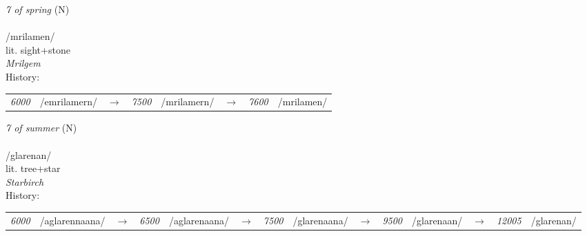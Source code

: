 \vspace{15pt}
\begin{nopagebreak}
 \textit{7 of spring} (N)\\
\\
\noindent /mril{\textprimstress}amen/\\
\noindent lit. sight+stone\\
\noindent \textit{Mrilgem}\\


\noindent History:

\vspace{-0pt}
\hspace{40pt}
\begin{tabular}{ccc}
\textit{6000} & /emrilamern/&$\rightarrow$ & \textit{7500} & /mrilamern/&$\rightarrow$ & \textit{7600} & /mrilamen/& \\
\end{tabular}

\vspace{20pt}\hline

\end{nopagebreak}
\filbreak



\vspace{15pt}
\begin{nopagebreak}
 \textit{7 of summer} (N)\\
\\
\noindent /glar{\textprimstress}enan/\\
\noindent lit. tree+star\\
\noindent \textit{Starbirch}\\


\noindent History:

\vspace{-0pt}
\hspace{40pt}
\begin{tabular}{ccc}
\textit{6000} & /aglarennaana/&$\rightarrow$ & \textit{6500} & /aglarenaana/&$\rightarrow$ & \textit{7500} & /glarenaana/&$\rightarrow$ & \textit{9500} & /glarenaan/&$\rightarrow$ & \textit{12005} & /glarenan/& \\
\end{tabular}

\vspace{20pt}\hline

\end{nopagebreak}
\filbreak



